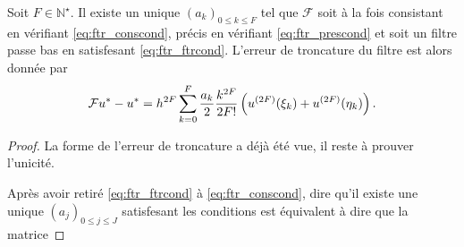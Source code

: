 \begin{theoreme}
Soit $F \in \mathbb{N}^{\star}$. Il existe un unique $(a_k)_{0 \leq k \leq F}$ tel que $\mathcal{F}$ soit à la fois consistant en vérifiant \eqref{eq:ftr_conscond}, précis en vérifiant \eqref{eq:ftr_prescond} et soit un filtre passe bas en satisfesant \eqref{eq:ftr_ftrcond}. L'erreur de troncature du filtre est alors donnée par 
\begin{equation}
\mathcal{F}u^* - u^* = h^{2F} \displaystyle\sum\limits_{k=0}^F \dfrac{a_k}{2} \dfrac{k^{2F}}{2F!} \left( u^{(2F)}(\xi_k) + u^{(2F)}(\eta_k) \right).
\end{equation}
\end{theoreme}

\begin{proof}
La forme de l'erreur de troncature a déjà été vue, il reste à prouver l'unicité.

Après avoir retiré \eqref{eq:ftr_ftrcond} à \eqref{eq:ftr_conscond}, dire qu'il existe une unique $(a_j)_{0 \leq j \leq J}$ satisfesant les conditions est équivalent à dire que la matrice


\end{proof}
